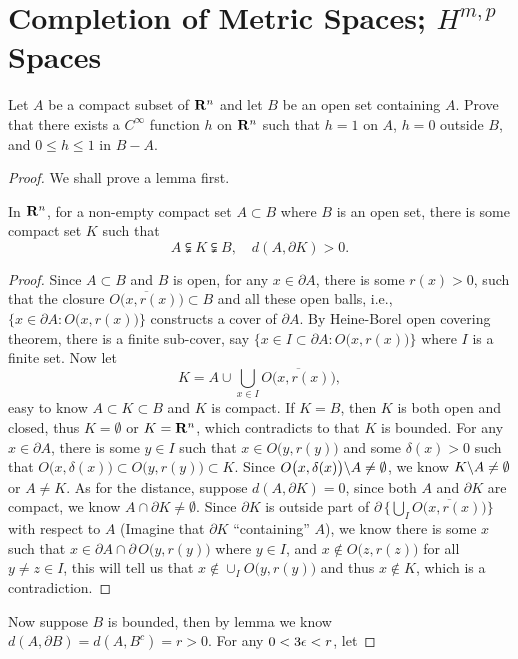 \section{Completion of Metric Spaces; $H^{m,p}$ Spaces}
\begin{pro}%
	Let $A$ be a compact subset of $\mathbf{R}^n$ and let $B$ be an open set containing $A$. Prove that there exists a $C^{\infty}$ function $h$ on $\mathbf{R}^n$ such that $h=1$ on $A$, $h=0$ outside $B$, and $0\leq h\leq 1$ in $B-A$.
\end{pro}
\begin{proof}
	We shall prove a lemma first.
	\begin{lem}
		In $\mathbf{R}^n$, for a non-empty compact set $A\subset B$ where $B$ is an open set, there is some compact set $K$ such that 
		\[A\subsetneqq K \subsetneqq B,\quad d(A,\partial K)>0.\]
	\end{lem}
	\begin{proof}
		Since $A\subset B$ and $B$ is open, for any $x\in \partial A$, there is some $r(x)>0$, such that the closure $\overline{O\big(x,r(x)\big)}\subset B$ and all these open balls, i.e., $\{x\in \partial A\colon O\big(x,r(x)\big)\}$ constructs a cover of $\partial A$. By Heine-Borel 
		open covering theorem, there is a finite sub-cover, say $\{x\in I\subset \partial A\colon O\big(x,r(x)\big)\}$ where $I$ is a finite set. Now let
		\[K=A\cup \bigcup_{x\in I} \overline{O\big(x,r(x)\big)},\]
		easy to know $A\subset K\subset B$ and $K$ is compact. If $K=B$, then $K$ is both open and closed, thus $K=\emptyset$ or $K=\mathbf{R}^n$, which contradicts to that $K$ is bounded. For any $x\in \partial A$, there is some $y\in I$ such that $x\in O\big(y,r(y)\big)$ and some $\delta(x)>0$ such that $O\big(x,\delta(x)\big)\subset O\big(y,r(y)\big)\subset K$. Since $O\big(x,\delta(x)\big)\backslash A\neq \emptyset$, we know $K\backslash A\neq \emptyset$ or $A\neq K$. As for the distance, 
		suppose $d(A,\partial K)=0$, since both $A$ and $\partial K$ are compact, we know $A\cap \partial K\neq \emptyset$. Since $\partial K$ is outside part of $\partial\,\Big\{\bigcup_I\overline{O\big(x,r(x)\big)}\Big\}$ with respect to $A$ (Imagine that $\partial K$ ``containing'' $A$), we know there is some $x$ such that $x\in \partial A\cap \partial\,O\big(y,r(y)\big)$ where $y\in I$, and $x\notin O\big(z,r(z)\big)$ for all $y\neq z\in I$, this will tell us that $x\notin \cup_I O\big(y,r(y)\big)$ and thus $x\notin K$, which is a contradiction.
	\end{proof} 
	Now suppose $B$ is bounded, then by lemma we know $d(A,\partial B)=d(A,B^c)=r>0$. For any $0<3\epsilon<r$, let

\end{proof}
